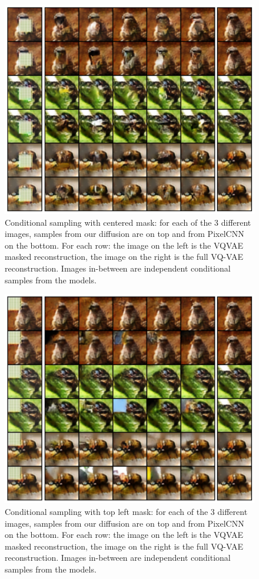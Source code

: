 \documentclass{article}
\theoremstyle{plain}
\theoremstyle{definition}
\theoremstyle{remark}
\begin{document}
\begin{figure}
    \centering
    \includegraphics[width=.7\linewidth]{./cond_samples_center_2.pdf}

    \caption{Conditional sampling with centered mask: for each of the 3 different images, samples from our diffusion are on top and from PixelCNN on the bottom. For each row: the image on the left is the VQVAE masked reconstruction, the image on the right is the full VQ-VAE reconstruction. Images in-between are independent conditional samples from the models.}
    \label{fig:miniimagenet_prior_ours_conditional}
\end{figure}


\begin{figure}
    \centering
    \includegraphics[width=.7\linewidth]{./cond_samples_topleft.pdf}

    \caption{Conditional sampling with top left mask: for each of the 3 different images, samples from our diffusion are on top and from PixelCNN on the bottom. For each row: the image on the left is the VQVAE masked reconstruction, the image on the right is the full VQ-VAE reconstruction. Images in-between are independent conditional samples from the models.}
    \label{fig:miniimagenet_prior_ours_conditional:topleft}
\end{figure}
\end{document}
